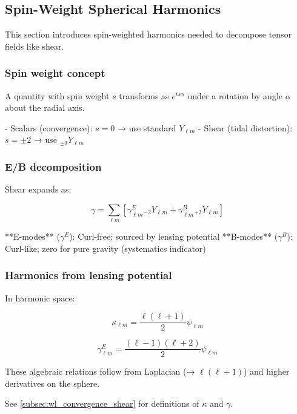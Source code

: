 \subsection{Spin-Weight Spherical Harmonics}\label{subsec:wl_spin_harmonics}

This section introduces spin-weighted harmonics needed to decompose tensor fields like shear.

\subsubsection{Spin weight concept}

A quantity with spin weight $s$ transforms as $e^{is\alpha}$ under a rotation by angle $\alpha$ about the radial axis.

- Scalars (convergence): $s = 0$ → use standard $Y_{\ell m}$
- Shear (tidal distortion): $s = \pm 2$ → use ${}_{\pm 2}Y_{\ell m}$

\subsubsection{E/B decomposition}

Shear expands as:

\begin{equation}
\gamma = \sum_{\ell m} \left[\gamma^E_{\ell m} {}_{-2}Y_{\ell m} + \gamma^B_{\ell m} {}_{+2}Y_{\ell m}\right]
\end{equation}

**E-modes** ($\gamma^E$): Curl-free; sourced by lensing potential  
**B-modes** ($\gamma^B$): Curl-like; zero for pure gravity (systematics indicator)

\subsubsection{Harmonics from lensing potential}

In harmonic space:

\begin{equation}
\kappa_{\ell m} = \frac{\ell(\ell+1)}{2} \psi_{\ell m}
\end{equation}

\begin{equation}
\gamma^E_{\ell m} = \frac{(\ell-1)(\ell+2)}{2} \psi_{\ell m}
\end{equation}

These algebraic relations follow from Laplacian (→ $\ell(\ell+1)$) and higher derivatives on the sphere.

See \cref{subsec:wl_convergence_shear} for definitions of $\kappa$ and $\gamma$.

